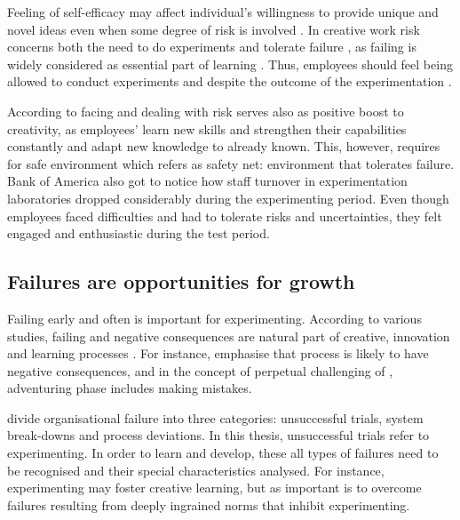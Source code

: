 Feeling of self-efficacy may affect individual's willingness to provide unique and novel ideas even when some degree of risk is involved \citep{mumford1988creativity}. In creative work risk concerns both the need to do experiments and tolerate failure \citep{andriopoulos2000enhancing,quinn1985managing}, as failing is widely considered as essential part of learning \citep{farson2002failuretolerantleader}. Thus, employees should feel being allowed to conduct experiments and despite the outcome of the experimentation \citep{jung2003role}.

According to \citet{andriopoulos2000enhancing} facing and dealing with risk serves also as positive boost to creativity, as employees' learn new skills and strengthen their capabilities constantly and adapt new knowledge to already known. This, however, requires for safe environment which \citet{andriopoulos2000enhancing} refers as safety net: environment that tolerates failure. Bank of America also got to notice how staff turnover in experimentation laboratories dropped considerably during the experimenting period. Even though employees faced difficulties and had to tolerate risks and uncertainties, they felt engaged and enthusiastic during the test period.  \citep{thomke2003r}

\subsection{Failures are opportunities for growth}
Failing early and often is important for experimenting. According to various studies, failing and negative consequences are natural part of creative, innovation and learning processes \citep{hennessey19881,shalley2004leaders,andriopoulos2000enhancing}. For instance, \citet{hennessey19881} emphasise that process is likely to have negative consequences, and in the concept of perpetual challenging of \citet{andriopoulos2000enhancing}, adventuring phase includes making mistakes. 

\citet{garvin2008yours} divide organisational failure into three categories: unsuccessful trials, system break-downs and process deviations. In this thesis, unsuccessful trials refer to experimenting. In order to learn and develop, these all types of failures need to be recognised and their special characteristics analysed. For instance, experimenting may foster creative learning, but as important is to overcome failures resulting from deeply ingrained norms that inhibit experimenting. \citep{garvin2008yours}

